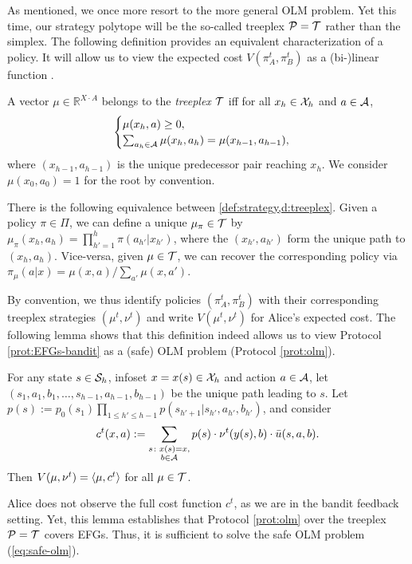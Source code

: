 \documentclass[11pt]{article}
\begin{document}
As mentioned, we once more resort to the more general OLM problem. Yet this time, our strategy polytope will be the so-called treeplex $\mathcal{P}=\mathcal{T}$ rather than the simplex. The following definition provides an equivalent characterization of a policy. It will allow us to view the expected cost $V(\pi^t_A,\pi^t_B)$ as a (bi-)linear function \citep{HGPS10}.
\begin{definition}\label{d:treeplex}
    A vector $\mu \in \mathbb{R}^{X\cdot A}$
    belongs to the \emph{treeplex} $\mathcal{T}$ iff for all $x_h\in \mathcal{X}_h$ and $a\in\mathcal{A}$,
    \begin{align}
        \begin{cases}
            \mu(x_h,a) \geq 0, \label{eq:pseudo}\\
            \sum_{a_h\in\mathcal{A}} \mu(x_h,a_h) = \mu(x_{h-1},a_{h-1}) ,
        \end{cases}
    \end{align}
    where $(x_{h-1},a_{h-1})$ is the unique predecessor pair reaching $x_h$. We consider $\mu(x_0,a_0)=1$ for the root by convention.
\end{definition}

\begin{remark}
    There is the following equivalence between \cref{def:strategy,d:treeplex}. Given a policy $\pi\in\Pi$, we can define a unique $\mu_{\pi} \in \mathcal{T}$ by $\mu_{\pi}(x_h,a_h) = \prod_{h'=1}^h \pi(a_{h'}|x_{h'})$, where the $(x_{h'},a_{h'})$ form the unique path to $(x_h,a_h)$. Vice-versa, given $\mu \in \mathcal{T}$, we can recover the corresponding policy via $\pi_{\mu}(a|x)=\mu(x,a)/\sum_{a'}\mu(x,a')$.    
\end{remark}
By convention, we thus identify policies $(\pi_A^t,\pi_B^t)$ with their corresponding treeplex strategies $(\mu^t,\nu^t)$ and write $V(\mu^t,\nu^t)$ for Alice's expected cost. The following lemma shows that this definition indeed allows us to view Protocol \ref{prot:EFGs-bandit} as a (safe) OLM problem (Protocol \ref{prot:olm}).
\begin{lemma}
    For any state $s\in\mathcal{S}_h$, infoset $x=x(s) \in \mathcal{X}_h$ and action $a \in \mathcal{A}$, let $(s_{1},a_{1},b_{1}, \dots ,s_{h-1},a_{h-1},b_{h-1})$ be the unique path leading to $s$. 
    Let $p(s):=p_0(s_1)\prod_{1\leq h'\leq h-1} p(s_{h'+1} | s_{h'},a_{h'},b_{h'})$, and consider
    \begin{align}
        c^t(x,a) := \sum_{\substack{s\colon x(s)=x,\\ b\in\mathcal{A}}} p(s)\cdot \nu^t(y(s),b) \cdot \bar{u}(s,a,b). \label{eq:def-loss}
    \end{align}
    Then $V(\mu,\nu^t) = \left\langle \mu, c^t \right\rangle$ for all $\mu\in\mathcal{T}$.
\end{lemma}
Alice does not observe the full cost function $c^t$, as we are in the bandit feedback setting. Yet, this lemma establishes that Protocol \ref{prot:olm} over the treeplex $\mathcal{P} = \mathcal{T}$ covers EFGs. Thus, it is sufficient to solve the safe OLM problem (\ref{eq:safe-olm}).
\end{document}
